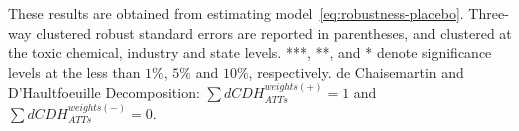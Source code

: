 \begin{table}[H]
    \centering
    \caption{Effect of the MW policy on Total Onsite Toxic Releases Intensity, from Catastrophic Events}
    \label{tab:robustness-placebo}
    \begin{minipage}{18cm}
        \vspace{0.05in}
        These results are obtained from estimating model~\ref{eq:robustness-placebo}. Three-way clustered robust standard errors are reported in parentheses, and clustered at the toxic chemical, industry and state levels. ***, **, and * denote significance levels at the less than $1\%$, $5\%$ and $10\%$, respectively. de Chaisemartin and D'Haultfoeuille Decomposition: $\sum dCDH_{ATTs}^{weights(+)} = 1$ and $\sum dCDH_{ATTs}^{weights(-)} = 0$.
    \end{minipage}
\end{table}
